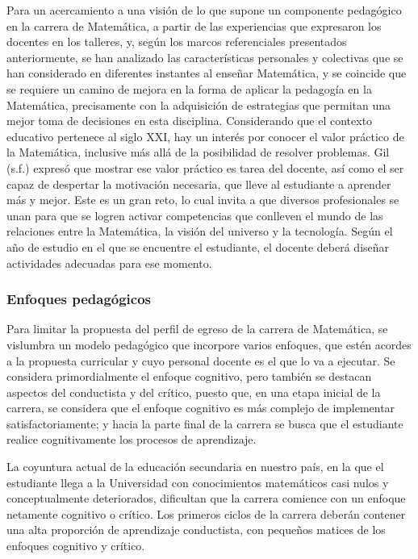 Para un acercamiento a una visión de lo que supone un componente pedagógico en la carrera de Matemática, a partir de las experiencias que expresaron los docentes en los talleres, y, según los marcos referenciales presentados anteriormente, se han analizado las características personales y colectivas que se han considerado en diferentes instantes al enseñar Matemática, y se coincide que se requiere un camino de mejora en la forma de aplicar la pedagogía en la Matemática, precisamente con la adquisición de estrategias que permitan una mejor toma de decisiones en esta disciplina.  
Considerando que el contexto educativo pertenece al siglo XXI, hay un interés por conocer el valor práctico de la Matemática, inclusive más allá de la posibilidad de resolver problemas. Gil (s.f.) expresó que mostrar ese valor práctico es tarea del docente, así como el ser capaz de despertar la motivación necesaria, que lleve al estudiante a aprender más y mejor. Este es un gran reto, lo cual invita a que diversos profesionales se unan para que se logren activar competencias que conlleven el mundo de las relaciones entre la Matemática, la visión del universo y la tecnología. Según el año de estudio en el que se encuentre el estudiante, el docente deberá diseñar actividades adecuadas para ese momento.  


\subsubsection{Enfoques pedagógicos}

Para limitar la propuesta del perfil de egreso de la carrera de Matemática, se vislumbra un modelo pedagógico que incorpore varios enfoques, que estén acordes a la propuesta curricular y cuyo personal docente es el que lo va a ejecutar. Se considera primordialmente el enfoque cognitivo, pero también se destacan aspectos del conductista y del crítico, puesto que, en una etapa inicial de la carrera, se considera que el enfoque cognitivo es más complejo de implementar satisfactoriamente; y hacia la parte final de la carrera se busca que el estudiante realice cognitivamente los procesos de aprendizaje.

La coyuntura actual de la educación secundaria en nuestro país, en la que el estudiante llega a la Universidad con conocimientos matemáticos casi nulos y conceptualmente deteriorados, dificultan que la carrera comience con un enfoque netamente cognitivo o crítico. Los primeros ciclos de la carrera deberán contener una alta proporción de aprendizaje conductista, con pequeños matices de los enfoques cognitivo y crítico. 

